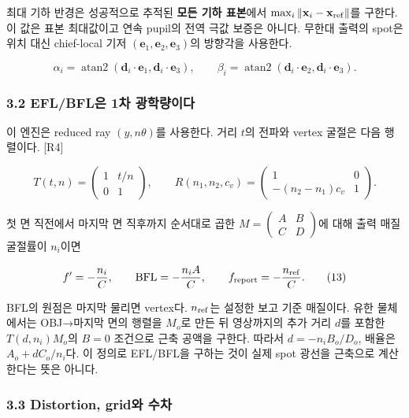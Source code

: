 \documentclass[
  a4paper,
]{article}
\begin{document}
최대 기하 반경은 성공적으로 추적된 \textbf{모든 기하 표본}에서
\(\max_i\|\mathbf x_i-\mathbf x_{\rm ref}\|\)를 구한다. 이 값은 표본
최대값이고 연속 pupil의 전역 극값 보증은 아니다. 무한대 출력의 spot은
위치 대신 chief-local 기저 \((\mathbf e_1,\mathbf e_2,\mathbf e_3)\)의
방향각을 사용한다.

\[
\alpha_i=\operatorname{atan2}(\mathbf d_i\cdot\mathbf e_1,
 \mathbf d_i\cdot\mathbf e_3),\qquad
\beta_i=\operatorname{atan2}(\mathbf d_i\cdot\mathbf e_2,
 \mathbf d_i\cdot\mathbf e_3).
\tag{11}
\]

\hypertarget{eflbfluxc740-1uxcc28-uxad11uxd559uxb7c9uxc774uxb2e4}{%
\subsubsection{3.2 EFL/BFL은 1차
광학량이다}\label{eflbfluxc740-1uxcc28-uxad11uxd559uxb7c9uxc774uxb2e4}}

이 엔진은 reduced ray \((y,n\theta)\)를 사용한다. 거리 \(t\)의 전파와
vertex 굴절은 다음 행렬이다. {[}R4{]}

\[
T(t,n)=\begin{pmatrix}1&t/n\\0&1\end{pmatrix},\qquad
R(n_1,n_2,c_v)=\begin{pmatrix}1&0\\-(n_2-n_1)c_v&1\end{pmatrix}.
\tag{12}
\]

첫 면 직전에서 마지막 면 직후까지 순서대로 곱한
\(M=\begin{pmatrix}A&B\\C&D\end{pmatrix}\)에 대해 출력 매질 굴절률이
\(n_i\)이면

\[
f'=-\frac{n_i}{C},\qquad
\mathrm{BFL}=-\frac{n_iA}{C},\qquad
f_{\rm report}=-\frac{n_{\rm ref}}{C}.
\tag{13}
\]

BFL의 원점은 마지막 물리면 vertex다. \(n_{\rm ref}\)는 설정한 보고 기준
매질이다. 유한 물체에서는 OBJ→마지막 면의 행렬을 \(M_o\)로 만든 뒤
영상까지의 추가 거리 \(d\)를 포함한 \(T(d,n_i)M_o\)의 \(B=0\) 조건으로
근축 공액을 구한다. 따라서 \(d=-n_iB_o/D_o\), 배율은 \(A_o+dC_o/n_i\)다.
이 정의로 EFL/BFL을 구하는 것이 실제 spot 광선을 근축으로 계산한다는
뜻은 아니다.

\hypertarget{distortion-griduxc640-uxc218uxcc28}{%
\subsubsection{3.3 Distortion, grid와
수차}\label{distortion-griduxc640-uxc218uxcc28}}
\end{document}
